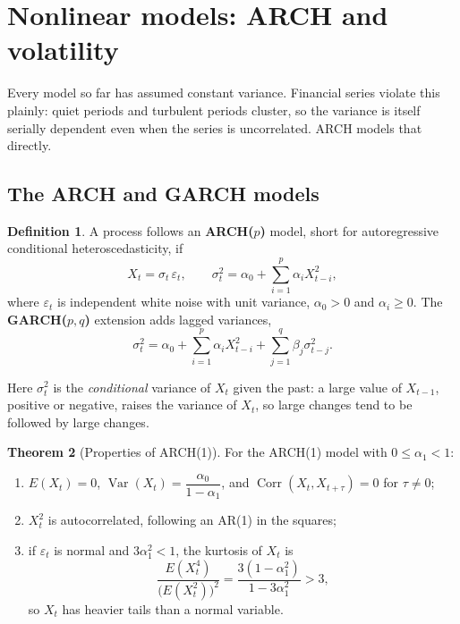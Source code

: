 \documentclass[11pt,a4paper]{article}
\theoremstyle{definition}
\newtheorem{thm}{Theorem}[subsection]
\newtheorem{defn}[thm]{Definition}
\DeclareMathOperator{\Var}{Var}
\DeclareMathOperator{\Corr}{Corr}
\begin{document}
\section{Nonlinear models: ARCH and volatility}\label{sec:arch}

Every model so far has assumed constant variance. Financial series violate this plainly: quiet periods and
turbulent periods cluster, so the variance is itself serially dependent even when the series is uncorrelated.
ARCH models that directly.

\subsection{The ARCH and GARCH models}

\begin{defn}
A process follows an \textbf{ARCH($p$)} model, short for autoregressive conditional
heteroscedasticity, if
\[
X_t = \sigma_t\,\varepsilon_t , \qquad \sigma_t^2 = \alpha_0 + \sum_{i=1}^p\alpha_iX_{t-i}^2 ,
\]
where $\varepsilon_t$ is independent white noise with unit variance, $\alpha_0 > 0$ and $\alpha_i \ge 0$. The \textbf{GARCH($p, q$)} extension adds lagged
variances,
\[
\sigma_t^2 = \alpha_0 + \sum_{i=1}^p\alpha_iX_{t-i}^2 + \sum_{j=1}^q\beta_j\sigma_{t-j}^2 .
\]
\end{defn}

Here $\sigma_t^2$ is the \emph{conditional} variance of $X_t$ given the past: a large value of $X_{t-1}$, positive or negative, raises the
variance of $X_t$, so large changes tend to be followed by large changes.

\begin{thm}[Properties of ARCH(1)]\label{thm:arch1}
For the ARCH(1) model with $0 \le \alpha_1 < 1$:
\begin{enumerate}[label=(\roman*)]
\item $E(X_t) = 0$, $\Var(X_t) = \dfrac{\alpha_0}{1 - \alpha_1}$, and $\Corr(X_t, X_{t+\tau}) = 0$ for $\tau \ne 0$;
\item $X_t^2$ is autocorrelated, following an AR(1) in the squares;
\item if $\varepsilon_t$ is normal and $3\alpha_1^2 < 1$, the kurtosis of $X_t$ is
\[
\frac{E(X_t^4)}{\bigl(E(X_t^2)\bigr)^2} = \frac{3(1 - \alpha_1^2)}{1 - 3\alpha_1^2} > 3 ,
\]
so $X_t$ has heavier tails than a normal variable.
\end{enumerate}
\end{thm}
\end{document}
